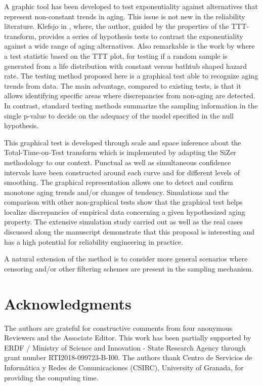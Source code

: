 \documentclass[preprint,12pt]{elsarticle}
\begin{document}

 
A graphic tool has been developed to test exponentiality against alternatives that represent non-constant trends in aging. This issue is not new in the reliability literature.  Klefsjo  in \cite{Klefsjo83a}, where, the author, guided by the properties of the TTT-transform, provides a series of hypothesis tests to contrast the exponentiality against a wide range of aging alternatives.
  Also remarkable is the work by \cite{A1987} where a test statistic based on the TTT plot, for testing if a random sample is generated from a life distribution with constant versus bathtub shaped hazard rate.
 The testing method proposed here is a graphical test able to recognize aging trends from data. The main advantage, compared to existing tests, is that it allows identifying specific areas where discrepancies from non-aging are detected. In contrast, standard testing methods summarize the sampling information in the single p-value to decide on the adequacy of the model specified in the null hypothesis.

  This graphical test is developed through scale and space inference about the Total-Time-on-Test transform which is implemented by adapting the SiZer methodology to our context. Punctual as well as simultaneous confidence intervals have been constructed around each curve and for different levels of smoothing. The graphical representation allows one to detect and confirm monotone aging trends and/or changes of tendency.
Simulations and the comparison with other non-graphical tests show that the graphical test helps localize discrepancies of empirical data concerning a given hypothesized aging property. The extensive simulation study carried out as well as the real cases discussed along the manuscript demonstrate that this proposal is interesting and has a high potential for reliability engineering in practice. 

A natural extension of the method is to consider more general scenarios where censoring and/or other filtering schemes are present in the sampling mechanism.



\section*{Acknowledgments} The authors are grateful for constructive comments from four anonymous Reviewers and the Associate Editor. This work has been partially supported by ERDF / Ministry of Science and Innovation - State Research Agency through grant number RTI2018-099723-B-I00. The authors thank Centro de Servicios de Inform\'atica y Redes de Comunicaciones (CSIRC), University of Granada, for providing the computing time. 
\end{document}
